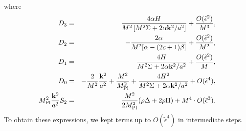 where
%
\begin{eqnarray}
 D_3 & = &
  \frac{4\alpha H}
  {M^2\left[M^2\Sigma+2\alpha{\bf k}^2/a^2\right]}
  + \frac{O(\tilde{\epsilon}^2)}{M^3},\nonumber\\
 D_2 & = & -\frac{2\alpha}{M^2[\alpha-(2c+1)\beta]}
  + \frac{O(\tilde{\epsilon}^2)}{M^2},\nonumber\\
 D_1 & = &  
  \frac{4H}{M^2\Sigma+2\alpha{\bf k}^2/a^2}
  + \frac{O(\tilde{\epsilon}^2)}{M},  \nonumber\\
 D_0 & = & 
  -\frac{2}{M^2}\frac{{\bf k}^2}{a^2} + \frac{M^2}{M_{\rm Pl}^2} 
  +\frac{4H^2}{M^2\Sigma+2\alpha{\bf k}^2/a^2}
  + O(\tilde{\epsilon}^4), \nonumber\\
 M_{\rm Pl}^2\frac{{\bf k}^2}{a^2}S_2 & = & 
   \frac{M^2}{2M_{\rm Pl}^2}(\rho\Delta+2p\Pi)
   + M^4\cdot O(\tilde{\epsilon}^3).
   \label{eqn:def-D-S2}
\end{eqnarray}
To obtain these expressions, we kept terms up to $O(\tilde{\epsilon}^4)$
in intermediate steps. 



